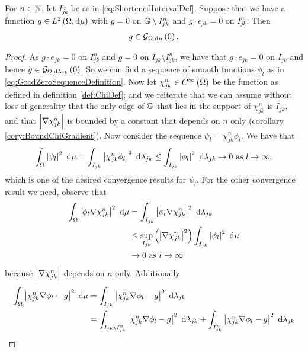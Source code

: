 \begin{lemma} \label{lem:SegGradExtend}
	For $n\in\mathbb{N}$, let $I_{jk}^n$ be as in \eqref{eq:ShortenedIntervalDef}.
	Suppose that we have a function $g\in L^{2}\left( \Omega,\mathrm{d}\mu \right)$ with $g=0$ on $\mathbb{G}\setminus I_{jk}^{n}$ and $g\cdot e_{jk}=0$ on $I_{jk}^{n}$.
	Then 
	\begin{align*}
		g\in\mathcal{G}_{ \Omega, \mathrm{d}\mu}\left( 0 \right).
	\end{align*}
\end{lemma}
\begin{proof}
	As $g\cdot e_{jk}=0$ on $I_{jk}^{n}$ and $g=0$ on $I_{jk}\setminus I_{jk}^{n}$, we have that $g\cdot e_{jk}=0$ on $I_{jk}$ and hence $g\in\mathcal{G}_{ \Omega, \mathrm{d}\lambda_{jk}}\left( 0 \right)$.
	So we can find a sequence of smooth functions $\phi_l$ as in \eqref{eq:GradZeroSequenceDefinition}.
	Now let $\chi_{jk}^{n}\in C^{\infty}\left( \Omega \right)$ be the function as defined in definition \ref{def:ChiDef}; and we reiterate that we can assume without loss of generality that the only edge of $\mathbb{G}$ that lies in the support of $\chi_{jk}^n$ is $I_{jk}$, and that $\left\lvert \nabla\chi_{jk}^{n} \right\rvert$ is bounded by a constant that depends on $n$ only (corollary \ref{cory:BoundChiGradient}).
	Now consider the sequence $\psi_l = \chi_{jk}^{n}\phi_l$.
	We have that
	\begin{align*}
		\int_{\Omega}\left\lvert \psi_l \right\rvert^2 \ \mathrm{d}\mu = \int_{I_{jk}}\left\lvert \chi_{jk}^{n}\phi_l \right\rvert^2 \ \mathrm{d}\lambda_{jk}
		\leq \int_{I_{jk}}\left\lvert \phi_l \right\rvert^2 \ \mathrm{d}\lambda_{jk} \rightarrow0 \ \text{as} \ l \rightarrow\infty,
	\end{align*}
	which is one of the desired convergence results for $\psi_l$.
	For the other convergence result we need, observe that
	\begin{align*}
		\int_{\Omega}\left\lvert \phi_l\nabla\chi_{jk}^{n} \right\rvert^2 \ \mathrm{d}\mu &= \int_{I_{jk}}\left\lvert \phi_l\nabla\chi_{jk}^{n} \right\rvert^2 \ \mathrm{d}\lambda_{jk} \\
		&\leq \sup_{I_{jk}}\left( \left\lvert \nabla\chi_{jk}^{n} \right\rvert^{2} \right)\int_{I_{jk}}\left\lvert \phi_l \right\rvert^2 \ \mathrm{d}\mu \\
		&\rightarrow 0 \ \text{as} \ l \rightarrow\infty
	\end{align*}
	because $\left\lvert \nabla\chi_{jk}^{n} \right\rvert$ depends on $n$ only.
	Additionally
	\begin{align*}
		\integral{\ddom}{\abs{\chi_{jk}^n\grad\phi_l - g}^2}{\ddmes} &= \integral{I_{jk}}{\abs{\chi_{jk}^n\grad\phi_l - g}^2}{\lambda_{jk}} \\
		&= \integral{I_{jk}\setminus I_{jk}^n}{\abs{\chi_{jk}^n\grad\phi_l - g}^2}{\lambda_{jk}} + \integral{I_{jk}^n}{\abs{\chi_{jk}^n\grad\phi_l - g}^2}{\lambda_{jk}} \\

\end{align*}
\end{proof}
